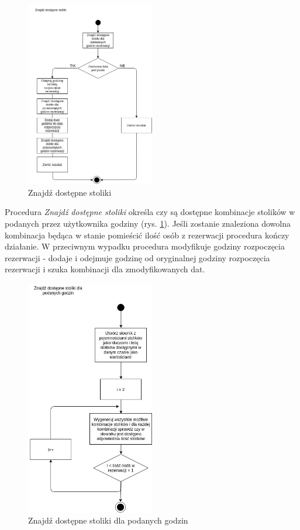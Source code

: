 \documentclass{article}
\begin{document}
\begin{figure}[H]
\centering
	\includegraphics[width=0.50\textwidth]{algo2.jpg}
	\caption{Znajdź dostępne stoliki}
	\label{fig:alg2}
\end{figure}

Procedura \textit{Znajdź dostępne stoliki} określa czy są dostępne kombinacje stolików w podanych przez użytkownika godziny (rys. \ref{fig:alg2}). Jeśli zostanie znaleziona dowolna kombinacja będąca w stanie pomieścić ilość osób z rezerwacji procedura kończy działanie. W przeciwnym wypadku procedura modyfikuje godziny rozpoczęcia rezerwacji - dodaje i odejmuje godzinę od oryginalnej godziny rozpoczęcia rezerwacji i szuka kombinacji dla zmodyfikowanych dat.


\begin{figure}[H]
\centering
	\includegraphics[width=0.50\textwidth]{algo3.jpg}
	\caption{Znajdź dostępne stoliki dla podanych godzin}
	\label{fig:alg3}
\end{figure}
\end{document}
